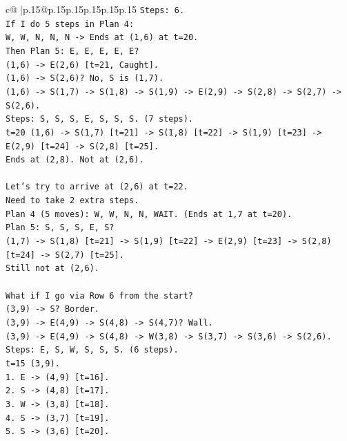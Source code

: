\documentclass{article}
\begin{document}
{\begin{supertabular}{c@{$\;$}|p{.15\linewidth}@{}p{.15\linewidth}p{.15\linewidth}p{.15\linewidth}p{.15\linewidth}p{.15\linewidth}}
{{{\texttt{Steps: 6.} \\
\texttt{If I do 5 steps in Plan 4:} \\
\texttt{W, W, N, N, N {-}> Ends at (1,6) at t=20.} \\
\texttt{Then Plan 5: E, E, E, E, E?} \\
\texttt{(1,6) {-}> E(2,6) {[}t=21, Caught{]}.} \\
\texttt{(1,6) {-}> S(2,6)? No, S is (1,7).} \\
\texttt{(1,6) {-}> S(1,7) {-}> S(1,8) {-}> S(1,9) {-}> E(2,9) {-}> S(2,8) {-}> S(2,7) {-}> S(2,6).} \\
\texttt{Steps: S, S, S, E, S, S, S. (7 steps).} \\
\texttt{t=20 (1,6) {-}> S(1,7) {[}t=21{]} {-}> S(1,8) {[}t=22{]} {-}> S(1,9) {[}t=23{]} {-}> E(2,9) {[}t=24{]} {-}> S(2,8) {[}t=25{]}.} \\
\texttt{Ends at (2,8). Not at (2,6).} \\
\\ 
\texttt{Let's try to arrive at (2,6) at t=22.} \\
\texttt{Need to take 2 extra steps.} \\
\texttt{Plan 4 (5 moves): W, W, N, N, WAIT. (Ends at 1,7 at t=20).} \\
\texttt{Plan 5: S, S, S, E, S?} \\
\texttt{(1,7) {-}> S(1,8) {[}t=21{]} {-}> S(1,9) {[}t=22{]} {-}> E(2,9) {[}t=23{]} {-}> S(2,8) {[}t=24{]} {-}> S(2,7) {[}t=25{]}.} \\
\texttt{Still not at (2,6).} \\
\\ 
\texttt{What if I go via Row 6 from the start?} \\
\texttt{(3,9) {-}> S? Border.} \\
\texttt{(3,9) {-}> E(4,9) {-}> S(4,8) {-}> S(4,7)? Wall.} \\
\texttt{(3,9) {-}> E(4,9) {-}> S(4,8) {-}> W(3,8) {-}> S(3,7) {-}> S(3,6) {-}> S(2,6).} \\
\texttt{Steps: E, S, W, S, S, S. (6 steps).} \\
\texttt{t=15 (3,9).} \\
\texttt{1. E {-}> (4,9) {[}t=16{]}.} \\
\texttt{2. S {-}> (4,8) {[}t=17{]}.} \\
\texttt{3. W {-}> (3,8) {[}t=18{]}.} \\
\texttt{4. S {-}> (3,7) {[}t=19{]}.} \\
\texttt{5. S {-}> (3,6) {[}t=20{]}.} \\
}}}
\end{supertabular}}
\end{document}
